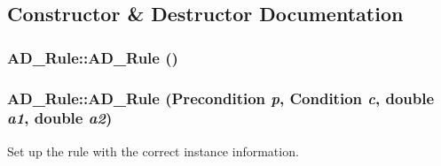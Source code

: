 \subsection{Constructor \& Destructor Documentation}
\hypertarget{classAD__Rule_a78595924816b520614bdc59afd34c61e}{
\subsubsection[{AD\_\-Rule}]{\setlength{\rightskip}{0pt plus 5cm}AD\_\-Rule::AD\_\-Rule ()}}
\label{classAD__Rule_a78595924816b520614bdc59afd34c61e}
\hypertarget{classAD__Rule_abec668f1da4b1893dbf335e9b542d666}{
\subsubsection[{AD\_\-Rule}]{\setlength{\rightskip}{0pt plus 5cm}AD\_\-Rule::AD\_\-Rule ({\bf Precondition} {\em p}, \/  {\bf Condition} {\em c}, \/  double {\em a1}, \/  double {\em a2})}}
\label{classAD__Rule_abec668f1da4b1893dbf335e9b542d666}
Set up the rule with the correct instance information. 

